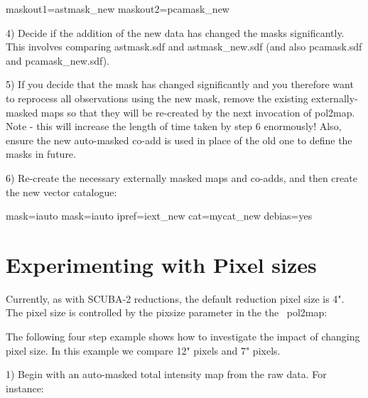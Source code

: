 \begin{terminalv}
maskout1=astmask_new           maskout2=pcamask_new
\end{terminalv}


4) Decide if the addition of the new data has changed the masks significantly. This involves
comparing astmask.sdf and astmask_new.sdf (and also pcamask.sdf and pcamask_new.sdf).


5) If you decide that the mask has changed significantly and you therefore want to
reprocess all observations using the new mask, remove the existing externally-masked 
maps so that they will be re-created by the next invocation of pol2map.  Note - this will
increase the length of time taken by step 6 enormously! Also, ensure the new auto-masked
co-add is used in place of the old one to define the masks in future.

\begin{terminalv}
\end{terminalv}

6) Re-create the necessary externally masked maps and co-adds, and then create the new
vector catalogue:

\begin{terminalv}
     mask=iauto
     mask=iauto ipref=iext_new cat=mycat_new debias=yes
\end{terminalv}

\section{Experimenting with Pixel sizes}

Currently, as with SCUBA-2 reductions, the default reduction pixel size is 4".
The pixel size is controlled by the pixsize parameter in the the \smurf\ pol2map:

\begin{terminalv}
\end{terminalv}


The following four step example shows how to investigate the impact of changing pixel size.
In this example we compare 12" pixels and 7" pixels.


1) Begin with an auto-masked total intensity map from the raw data. For instance:

